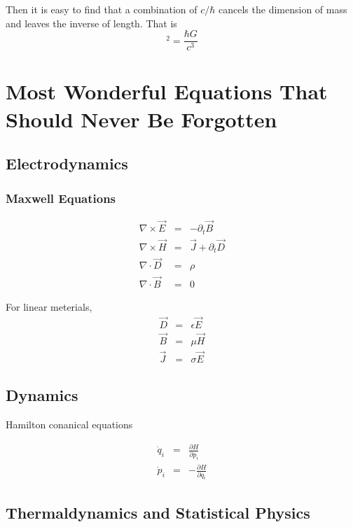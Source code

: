\documentclass[12pt,a4paper]{book}
\begin{document}
Then it is easy to find that a combination of $c/\hbar$ cancels the dimension of mass and leaves the inverse of length. That is
\begin{equation}
[Length]^2 = \frac{\hbar G}{c^3}
\end{equation}



\section{Most Wonderful Equations That Should Never Be Forgotten}

\subsection{Electrodynamics}

\subsubsection{Maxwell Equations}
\begin{eqnarray}
\nabla\times\vec E&=&-\partial_t \vec B \\
\nabla\times\vec H&=&\vec J+\partial_t \vec D \\
\nabla\cdot \vec D&=&\rho \\
\nabla\cdot \vec B&=&0
\end{eqnarray}

For linear meterials, \begin{eqnarray}
\vec D&=&\epsilon \vec E \\
\vec B&=&\mu \vec H \\
\vec J&=& \sigma \vec E
\end{eqnarray}


\subsection{Dynamics}

Hamilton conanical equations

\begin{eqnarray}
\dot q_i &=& \frac{\partial H}{\partial p_i}  \\
\dot p_i &=& - \frac{\partial H}{\partial q_i}
\end{eqnarray}


\subsection{Thermaldynamics and Statistical Physics}
\end{document}
